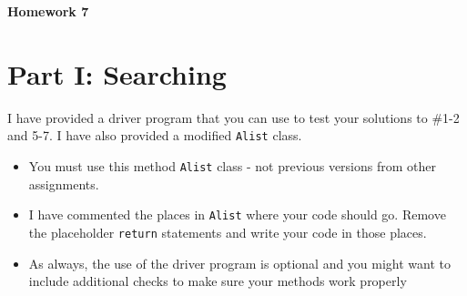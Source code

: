 \documentclass[10pt]{article}
\begin{document}
\begin{center}
	\large{\textbf{Homework 7}}
\end{center}

\section{Part I: Searching}
I have provided a driver program that you can use to test your solutions to \#1-2 and 5-7. I have also provided a modified \texttt{Alist} class.
	
	\begin{itemize}
		\item You must use this method \texttt{Alist} class - not previous versions from other assignments.
		
		\item I have commented the places in \texttt{Alist} where your code should go. Remove the placeholder \texttt{return} statements and write your code in those places.
		
		\item As always, the use of the driver program is optional and you might want to include additional checks to make sure your methods work properly
	\end{itemize}
	
\end{document}
